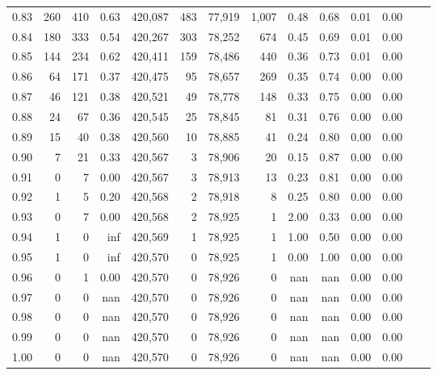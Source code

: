 \begin{tabular}{rrrrrrrrrrrrrr}
0.83 &     260 &    410 &    0.63 &  420,087 &      483 &  77,919 &   1,007 &  0.48 &  0.68 &  0.01 &      0.00 \\
0.84 &     180 &    333 &    0.54 &  420,267 &      303 &  78,252 &     674 &  0.45 &  0.69 &  0.01 &      0.00 \\
0.85 &     144 &    234 &    0.62 &  420,411 &      159 &  78,486 &     440 &  0.36 &  0.73 &  0.01 &      0.00 \\
0.86 &      64 &    171 &    0.37 &  420,475 &       95 &  78,657 &     269 &  0.35 &  0.74 &  0.00 &      0.00 \\
0.87 &      46 &    121 &    0.38 &  420,521 &       49 &  78,778 &     148 &  0.33 &  0.75 &  0.00 &      0.00 \\
0.88 &      24 &     67 &    0.36 &  420,545 &       25 &  78,845 &      81 &  0.31 &  0.76 &  0.00 &      0.00 \\
0.89 &      15 &     40 &    0.38 &  420,560 &       10 &  78,885 &      41 &  0.24 &  0.80 &  0.00 &      0.00 \\
0.90 &       7 &     21 &    0.33 &  420,567 &        3 &  78,906 &      20 &  0.15 &  0.87 &  0.00 &      0.00 \\
0.91 &       0 &      7 &    0.00 &  420,567 &        3 &  78,913 &      13 &  0.23 &  0.81 &  0.00 &      0.00 \\
0.92 &       1 &      5 &    0.20 &  420,568 &        2 &  78,918 &       8 &  0.25 &  0.80 &  0.00 &      0.00 \\
0.93 &       0 &      7 &    0.00 &  420,568 &        2 &  78,925 &       1 &  2.00 &  0.33 &  0.00 &      0.00 \\
0.94 &       1 &      0 &     inf &  420,569 &        1 &  78,925 &       1 &  1.00 &  0.50 &  0.00 &      0.00 \\
0.95 &       1 &      0 &     inf &  420,570 &        0 &  78,925 &       1 &  0.00 &  1.00 &  0.00 &      0.00 \\
0.96 &       0 &      1 &    0.00 &  420,570 &        0 &  78,926 &       0 &   nan &   nan &  0.00 &      0.00 \\
0.97 &       0 &      0 &     nan &  420,570 &        0 &  78,926 &       0 &   nan &   nan &  0.00 &      0.00 \\
0.98 &       0 &      0 &     nan &  420,570 &        0 &  78,926 &       0 &   nan &   nan &  0.00 &      0.00 \\
0.99 &       0 &      0 &     nan &  420,570 &        0 &  78,926 &       0 &   nan &   nan &  0.00 &      0.00 \\
1.00 &       0 &      0 &     nan &  420,570 &        0 &  78,926 &       0 &   nan &   nan &  0.00 &      0.00 \\
\bottomrule
\end{tabular}
